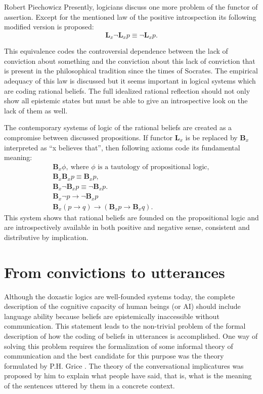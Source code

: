 \begin{artengenv}{Robert Piechowicz}
Presently, logicians discuss one more problem of the functor of assertion. Except for the mentioned law of the positive introspection its following modified version is proposed:
$$\mathbf{L}_{x}\neg \mathbf{L}_{x} p\equiv \neg \mathbf{ L}_{x}p.$$

This equivalence codes the controversial dependence between the lack of conviction about something and the conviction about this lack of conviction that is present in the philosophical tradition since the times of Socrates. The empirical adequacy of this law is discussed but it seems important in logical systems which are coding rational beliefs. The full idealized rational reflection should not only show all epistemic states but must be able to give an introspective look on the lack of them as well.

The contemporary systems of logic of the rational beliefs are created as a compromise between discussed propositions. If functor $\mathbf{L}_{x}$  is be replaced by $\mathbf{B}_{x}$ interpreted as ``x believes that'', then following axioms code its fundamental meaning:
\begin{gather}
\mathbf{B}_{x}\phi,\tag*{1.}\ 
\text{where $\phi$ is a tautology of propositional logic},\\
\mathbf{B}_{x}\mathbf{B}_{x} p\equiv\mathbf{ B}_{x}p,\tag*{2.}\\
\mathbf{B}_{x}\neg\mathbf{B}_{x} p\equiv\neg \mathbf{ B}_{x}p.\tag*{3.}\\
\mathbf{B}_{x}\neg p\rightarrow \neg \mathbf{B}_{x} p \tag*{4.}\\
\mathbf{B}_{x}(p\rightarrow q)\rightarrow (\mathbf{B}_{x}p\rightarrow \mathbf{B}_{x}q).\tag*{5.}
\end{gather}
This system shows that rational beliefs are founded on the propositional logic and are introspectively available in both positive and negative sense, consistent and distributive by implication.

\section{From convictions to utterances}

\indent Although the doxastic logics are well-founded systems today, the complete description of the cognitive capacity of human beings (or AI) should include language ability because beliefs are epistemically inaccessible without communication. This statement leads to the non-trivial problem of the formal description of how the coding of beliefs in utterances is accomplished. One way of solving this problem requires the formalization of some informal theory of communication and the best candidate for this purpose was the theory formulated by P.H. Grice
\parencite*[pp.22-40]{grice_studies_1989}.
The theory of the conversational implicatures was proposed by him to explain what people have said, that is, what is the meaning of the sentences uttered by them in a concrete context.


\end{artengenv}
